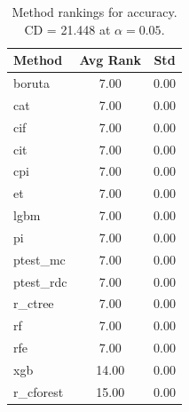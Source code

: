 \begin{table}[h]
\centering
\caption{Method rankings for accuracy. CD = 21.448 at $\alpha=0.05$.}
\label{tab:ranks_accuracy}
\begin{tabular}{lcc}
\toprule
Method & Avg Rank & Std \\
\midrule
boruta & 7.00 & 0.00 \\
cat & 7.00 & 0.00 \\
cif & 7.00 & 0.00 \\
cit & 7.00 & 0.00 \\
cpi & 7.00 & 0.00 \\
et & 7.00 & 0.00 \\
lgbm & 7.00 & 0.00 \\
pi & 7.00 & 0.00 \\
ptest_mc & 7.00 & 0.00 \\
ptest_rdc & 7.00 & 0.00 \\
r_ctree & 7.00 & 0.00 \\
rf & 7.00 & 0.00 \\
rfe & 7.00 & 0.00 \\
xgb & 14.00 & 0.00 \\
r_cforest & 15.00 & 0.00 \\
\bottomrule
\end{tabular}
\end{table}